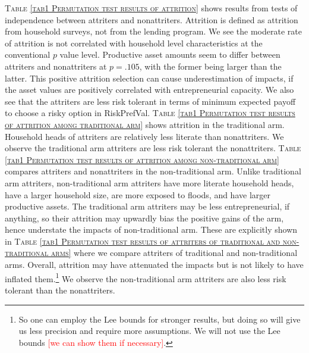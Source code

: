 	\textsc{\normalsize Table \ref{tab1 Permutation test results of attrition}} shows results from tests of independence between attriters and nonattriters. Attrition is defined as attrition from household surveys, not from the lending program. We see the moderate rate of attrition is not correlated with household level characteristics%
	at the conventional $p$ value level. Productive asset amounts seem to differ between attriters and nonattriters at $p=.105$, with the former being larger than the latter. This positive attrition selection can cause underestimation of impacts, if the asset values are positively correlated with entrepreneurial capacity. We also see that the attriters are less risk tolerant in terms of minimum expected payoff to choose a risky option in \textsf{RiskPrefVal}. \textsc{\normalsize Table \ref{tab1 Permutation test results of attrition among traditional arm}} shows attrition in the \textsf{traditional} arm. Household heads of attriters are relatively less literate than nonattriters. We observe the \textsf{traditional} arm attriters are less risk tolerant the nonattriters.
	\textsc{\normalsize Table \ref{tab1 Permutation test results of attrition among non-traditional arm}} compares attriters and nonattriters in the non-\textsf{traditional} arm. Unlike \textsf{traditional} arm attriters, non-\textsf{traditional} arm attriters have more literate household heads, have a larger household size, are more exposed to floods, and have larger productive assets. The \textsf{traditional} arm attriters may be less entrepreneurial, if anything, so their attrition may upwardly bias the positive gains of the arm, hence understate the impacts of non-\textsf{traditional} arm. These are explicitly shown in \textsc{\normalsize Table \ref{tab1 Permutation test results of attriters of traditional and non-traditional arms}} where we compare attriters of \textsf{traditional} and non-\textsf{traditional} arms. Overall, attrition may have attenuated the impacts but is not likely to have inflated them.\footnote{So one can employ the Lee bounds for stronger results, but doing so will give us less precision and require more assumptions. We will not use the Lee bounds \textcolor{red}{[we can show them if necessary]}. } We observe the non-\textsf{traditional} arm attriters are also less risk tolerant than the nonattriters.


